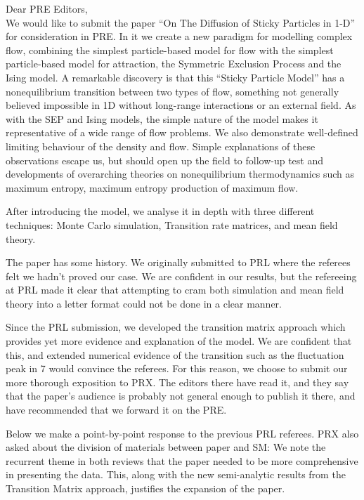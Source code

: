 \documentclass[a4paper,10pt]{article}
\title{}
\author{Joshua DM Hellier and Graeme J Ackland}
\begin{document}
\maketitle

 Dear PRE Editors, \\ 

We would like to submit the paper ``On The Diffusion of Sticky
Particles in 1-D'' for consideration in PRE.  In it we create a new
paradigm for modelling complex flow, combining the simplest
particle-based model for flow with the simplest particle-based model
for attraction, the Symmetric Exclusion Process and the Ising model.
A remarkable discovery is that this ``Sticky Particle Model'' has a
nonequilibrium transition between two types of flow, something not
generally believed impossible in 1D without long-range interactions or
an external field.  As with the SEP and Ising models, the simple
nature of the model makes it representative of a wide range
of flow problems.  We also demonstrate well-defined limiting behaviour
of the density and flow.  Simple explanations of these observations
escape us, but should open up the field to follow-up test and
developments of overarching theories on nonequilibrium thermodynamics
such as maximum entropy, maximum entropy production of maximum flow.

After introducing the model, we analyse it in depth with three
different techniques: Monte Carlo simulation, Transition rate
matrices, and mean field theory.

The paper has some history.  We originally submitted to PRL where the
referees felt we hadn't proved our case.  We are confident in our
results, but the refereeing at PRL made it clear that attempting to
cram both simulation and mean field theory into a letter format could
not be done in a clear manner.

Since the PRL submission, we developed the transition matrix approach
which provides yet more evidence and explanation of the model.  We are
confident that this, and extended numerical evidence of the transition
such as the fluctuation peak in 7 would convince the referees.  For
this reason, we choose to submit our more thorough exposition to
PRX. The editors there have read it, and they say that the paper's audience is probably not general enough
to publish it there, and have recommended that we forward it on the PRE.

\newpage



Below we make a point-by-point response to the previous PRL
referees.  PRX  also asked about the division of materials between
paper and SM: We note the recurrent theme in both reviews that the
paper needed to be more comprehensive in presenting the data.  This,
along with the new semi-analytic results from the Transition Matrix
approach, justifies the expansion of the paper.
\end{document}
